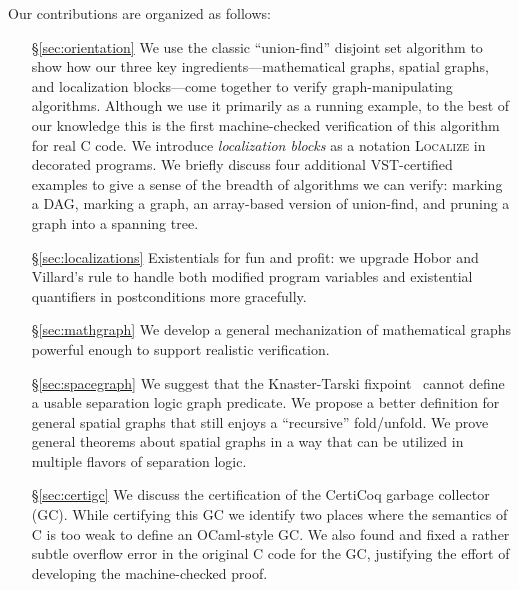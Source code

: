 Our contributions are organized as follows:
\begin{itemize}
\item[\S\ref{sec:orientation}] We use the classic ``union-find'' disjoint set algorithm to show how our three key ingredients---mathematical graphs, spatial graphs, and localization blocks---come together to verify
graph-manipulating algorithms.
Although we use it primarily as a running example, to the best of our knowledge this is the first machine-checked verification of this algorithm for real C code.
We introduce \emph{localization blocks} as a notation \textsc{Localize} in decorated programs. We briefly discuss four additional VST-certified examples to give a sense of the breadth of algorithms we can verify: marking a DAG, marking a graph, an array-based version of union-find, and pruning a graph into a spanning tree. %
\item[\S\ref{sec:localizations}] Existentials for fun and profit: we upgrade Hobor and Villard's  rule to handle both modified program variables and existential quantifiers in postconditions more gracefully.
\item[\S\ref{sec:mathgraph}] {\color{magenta}We develop a general mechanization of mathematical graphs powerful enough to support realistic verification.}
\item[\S\ref{sec:spacegraph}] We suggest that the Knaster-Tarski fixpoint~\cite{tarski:fixpoint} cannot define a usable separation logic graph predicate.  We propose a better definition for general spatial graphs that still enjoys a ``recursive'' fold/unfold.  We prove general theorems about spatial graphs in a way that can be utilized in multiple flavors of separation logic. %
\item[\S\ref{sec:certigc}] We discuss the certification of the CertiCoq garbage collector (GC). While certifying this GC we identify two places where the semantics of C is too weak to define an OCaml-style GC. We also found and fixed a rather subtle overflow error in the original C code for the GC, justifying the effort of developing the machine-checked proof.

\end{itemize}
